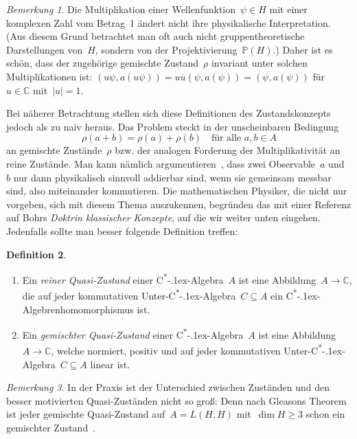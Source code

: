\documentclass[a4paper,ngerman,12pt]{scrartcl}
\theoremstyle{definition}
\newtheorem{defn}{Definition}[section]
\theoremstyle{plain}
\theoremstyle{remark}
\newtheorem{bem}[defn]{Bemerkung}
\newcommand{\CC}{\mathbb{C}}
\newcommand{\csalgebra}{C\textsuperscript{*}\kern-.1ex-Algebra}
\newcommand{\csalgebren}{C\textsuperscript{*}\kern-.1ex-Alge\-bren}
\renewcommand{\_}{\mathpunct{.}\,}
\newcommand{\?}{\,{:}\,}
\begin{document}
\begin{bem}Die Multiplikation einer Wellenfunktion~$\psi \in H$ mit einer
komplexen Zahl vom Betrag~1 ändert nicht ihre physikalische Interpretation. (Aus
diesem Grund betrachtet man oft auch nicht gruppentheoretische Darstellungen
von~$H$, sondern von der Projektivierung~$\mathbb{P}(H)$.) Daher ist es
schön, dass der zugehörige gemischte Zustand~$\rho$ invariant unter solchen
Multiplikationen ist: $(u\psi, a(u\psi)) = u \overline{u} (\psi,a(\psi)) =
(\psi,a(\psi))$ für~$u \in \CC$ mit~$|u| = 1$.\end{bem}

Bei näherer Betrachtung stellen sich diese Definitionen des Zustandskonzepts jedoch als zu naiv heraus. Das
Problem steckt in der unscheinbaren Bedingung
\[ \rho(a + b) = \rho(a) + \rho(b) \quad\text{für alle~$a,b \in A$} \]
an gemischte Zustände~$\rho$ bzw. der analogen Forderung der
Multiplikativität an reine Zustände. Man kann nämlich
argumentieren~\cite[Seite~27]{topos:aqt},
dass zwei Observable~$a$ und~$b$ nur dann physikalisch sinnvoll addierbar sind,
wenn sie gemeinsam messbar sind, also miteinander kommutieren. Die
mathematischen Physiker, die nicht nur vorgeben, sich mit diesem Thema
auszukennen, begründen das mit einer Referenz auf Bohrs \emph{Doktrin
klassischer Konzepte}, auf die wir weiter unten eingehen. Jedenfalls sollte man
besser folgende Definition treffen:

\begin{defn}\begin{enumerate}
\item
Ein \emph{reiner Quasi-Zustand} einer \csalgebra~$A$ ist eine Abbildung~$A \to \CC$,
die auf jeder kommutativen Unter-\csalgebra~$C \subseteq A$ ein
\csalgebren\-homo\-mor\-phis\-mus ist.
\item Ein \emph{gemischter Quasi-Zustand} einer \csalgebra~$A$ ist eine Abbildung~$A
\to \CC$, welche normiert, positiv und auf jeder kommutativen
Unter-\csalgebra~$C \subseteq A$ linear ist.
\end{enumerate}
\end{defn}

\begin{bem}In der Praxis ist der Unterschied zwischen Zuständen und den besser
motivierten Quasi-Zuständen nicht so groß: Denn nach Gleasons Theorem ist jeder
gemischte Quasi-Zustand auf~$A = L(H,H)$ mit~$\dim H \geq 3$ schon ein
gemischter Zustand~\cite{nlab:gleason}.\end{bem}
\end{document}
